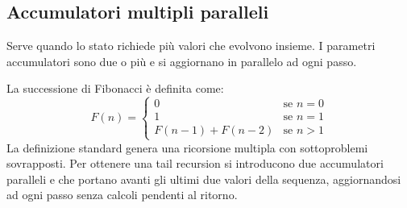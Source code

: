 \subsection{ Accumulatori multipli paralleli}
Serve quando lo stato richiede più valori che evolvono insieme. I parametri accumulatori sono due o più e si aggiornano in parallelo ad ogni passo.

















\begin{codeexample}

  La successione di Fibonacci è definita come:
  \[
    F(n) = \begin{cases}
      0               & \text{se } n = 0 \\
      1               & \text{se } n = 1 \\
      F(n-1) + F(n-2) & \text{se } n > 1
    \end{cases}
  \]
  La definizione standard genera una ricorsione multipla con
  sottoproblemi sovrapposti. Per ottenere una tail recursion si
  introducono due accumulatori paralleli  e
   che portano avanti gli ultimi due valori della
  sequenza, aggiornandosi ad ogni passo senza calcoli pendenti
  al ritorno.

\end{codeexample}
